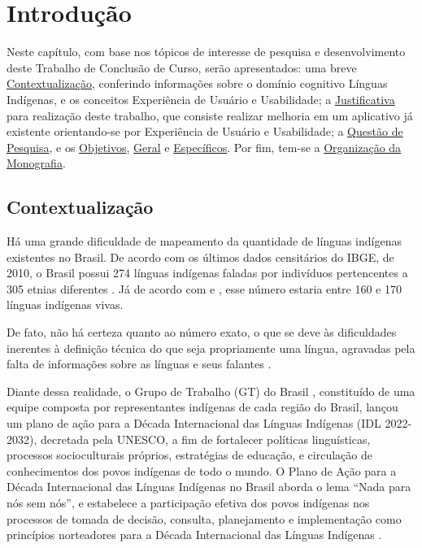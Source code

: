 \chapter[Introdução]{Introdução}
\label{chap:Introducao}

Neste capítulo, com base nos tópicos de interesse de pesquisa e desenvolvimento deste Trabalho de Conclusão de Curso, serão apresentados: uma breve
\hyperref[sec:Contextualização]{Contextualização}, conferindo informações sobre o domínio cognitivo Línguas Indígenas, e os conceitos Experiência de Usuário e
Usabilidade; a \hyperref[sec:Justificativa]{Justificativa} para realização deste trabalho, que consiste realizar melhoria em um aplicativo já existente orientando-se por
Experiência de Usuário e Usabilidade; a \hyperref[sec:QuestaodePesquisa]{Questão de Pesquisa}, e os \hyperref[sec:Objetivos]{Objetivos},
\hyperref[sec:ObjetivoGeral]{Geral} e \hyperref[sec:ObjetivosEspecificos]{Específicos}. Por fim, tem-se a \hyperref[sec:OrganizacaodaMonografia]{Organização da Monografia}.

\section{Contextualização}
\label{sec:Contextualização}

Há uma grande dificuldade de mapeamento da quantidade de línguas indígenas existentes no Brasil. De acordo com os últimos dados censitários do IBGE, de 2010, o Brasil
possui 274 línguas indígenas faladas por indivíduos pertencentes a 305 etnias diferentes \cite{ibge}. Já de acordo com  e , esse
número estaria entre 160 e 170 línguas indígenas vivas.

De fato, não há certeza quanto ao número exato, o que se deve às dificuldades inerentes à definição técnica do que seja propriamente uma língua, agravadas pela falta de
informações sobre as línguas e seus falantes \cite{seki2000}.

Diante dessa realidade, o Grupo de Trabalho (GT) do Brasil \cite{gtbrasil2021}, constituído de uma equipe composta por representantes indígenas de cada região do Brasil,
lançou um plano de ação para a Década Internacional das Línguas Indígenas (IDL 2022-2032), decretada pela UNESCO, a fim de fortalecer políticas linguísticas, processos
socioculturais próprios, estratégias de educação, e circulação de conhecimentos dos povos indígenas de todo o mundo. O Plano de Ação para a Década Internacional das
Línguas Indígenas no Brasil aborda o lema “Nada para nós sem nós”, e estabelece a participação efetiva dos povos indígenas nos processos de tomada de decisão, consulta,
planejamento e implementação como princípios norteadores para a Década Internacional das Línguas Indígenas \cite{gtbrasil2021}.

